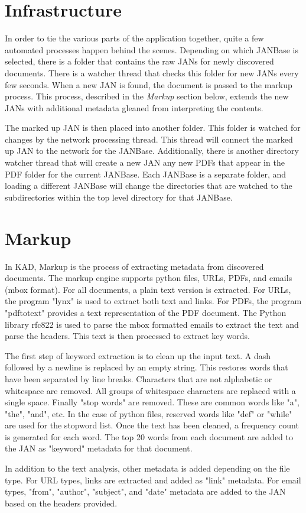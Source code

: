 \documentclass{article}
\begin{document}
\begin{doublespace}
\section{Infrastructure}
In order to tie the various parts of the application together,
quite a few automated processes happen behind the scenes.
Depending on which JANBase is selected, there is a folder that contains the raw JANs for newly discovered documents.
There is a watcher thread that checks this folder for new JANs every few seconds.
When a new JAN is found, the document is passed to the markup process.
This process, described in the {\it Markup} section below, extends the new JANs with additional metadata gleaned
from interpreting the contents.
\par
The marked up JAN is then placed into another folder.
This folder is watched for changes by the network processing thread.
This thread will connect the marked up JAN to the network for the JANBase.
Additionally, there is another directory watcher thread that will create a new JAN any new PDFs that appear in
the PDF folder for the current JANBase.
Each JANBase is a separate folder, and loading a different JANBase will change the directories that are watched
to the subdirectories within the top level directory for that JANBase. 
\section{Markup}
In KAD, Markup is the process of extracting metadata from discovered documents.
The markup engine supports python files, URLs, PDFs, and emails (mbox format).
For all documents, a plain text version is extracted.
For URLs, the program "lynx" is used to extract both text and links.
For PDFs, the program "pdftotext" provides a text representation of the PDF document.
The Python library rfc822 is used to parse the mbox formatted emails to extract the text and parse the headers.
This text is then processed to extract key words.
\par
The first step of keyword extraction is to clean up the input text.
A dash followed by a newline is replaced by an empty string.  This restores words that have been separated by line breaks.
Characters that are not alphabetic or whitespace are removed.
All groups of whitespace characters are replaced with a single space.
Finally "stop words" are removed. These are common words like "a", "the", "and", etc.
In the case of python files, reserved words like "def" or "while" are used for the stopword list.
Once the text has been cleaned, a frequency count is generated for each word.
The top 20 words from each document are added to the JAN as "keyword" metadata for that document.
\par
In addition to the text analysis, other metadata is added depending on the file type.
For URL types, links are extracted and added as "link" metadata.
For email types, "from", "author", "subject", and "date" metadata are added to the JAN based on the headers provided.
\end{doublespace}
\end{document}
